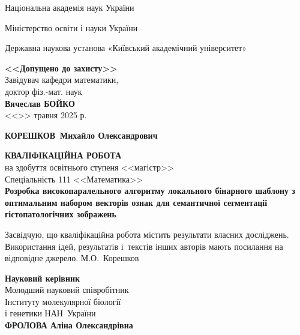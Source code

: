 \documentclass{thesis}
\newcommand{\MyFullName}{КОРЕШКОВ~Михайло Олександрович}
\newcommand{\MyReverseInitialName}{М.О.~Корешков}
\newcommand{\ThesisName}{Розробка високопаралельного алгоритму локального бінарного шаблону з оптимальним набором векторів ознак для семантичної сегментації гістопатологічних зображень}
\newcommand{\SuperviserFullName}{ФРОЛОВА Аліна Олександрівна}
\newcommand{\SuperviserAffiliation}{Молодший науковий співробітник\\Інституту молекулярної біології\\і генетики НАН~України}
\newcommand{\1}{\mathds 1}
\begin{document}
\allowdisplaybreaks

\large

\setcounter{page}{1}
\thispagestyle{empty}
\centerline{Національна академія наук України}
\centerline{Міністерство освіти і науки України}
\centerline{Державна наукова установа «Київський академічний університет»}

\vspace{10mm}

\begin{flushright}
\begin{minipage}{100mm}
\begin{center}\large {\bf <<Допущено до захисту>>}\\
Завідувач кафедри математики,\\
доктор фіз.-мат. наук\\
{\bf Вячеслав БОЙКО}\\
<<\underline{\hspace{8mm}}>> травня 2025 р.
\end{center}
\end{minipage}
\end{flushright}

\vspace{10mm}

\centerline{\Large \bf \MyFullName}

\begin{center}
{\bf КВАЛІФІКАЦІЙНА РОБОТА}\\
на здобуття освітнього ступеня <<магістр>>\\
Спеціальність 111 <<Математика>>\\[4mm]
{\Large \bf \ThesisName}
\end{center}


\vspace{5mm}

\noindent
{Засвідчую, що кваліфікаційна робота містить результати власних досліджень. Використання ідей, результатів і~текстів інших авторів мають посилання на відповідне джерело.
\underline{\hspace{18mm}} \MyReverseInitialName \par}

\vspace{5mm}

\begin{flushright}
\begin{minipage}{90mm}
\large {\bf Науковий керівник}\\
\SuperviserAffiliation\\
{\bf \SuperviserFullName }\\
\underline{\hspace{48mm}}

\end{minipage}
\end{flushright}
\end{document}
